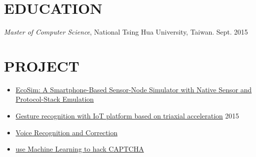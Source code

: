 \documentclass{res}
\begin{document}
\begin{resume}
			\vspace{-0.3in}
			\section{EDUCATION}
			\vspace{0.1in}
				{\sl Master of Computer Science}, National Tsing Hua University, Taiwan. \hfill Sept. 2015\\
				
			\vspace{-0.4in}
			\section{PROJECT}
			\begin{itemize}
					\item \href{https://www.youtube.com/watch?v=1UUcqf0pjM0}{EcoSim: A Smartphone-Based Sensor-Node Simulator with Native Sensor and Protocol-Stack Emulation}
					\vspace{-0.05in}
					\item \href{https://www.youtube.com/watch?v=VInyJABrmPo}{Gesture recognition with IoT platform based on triaxial acceleration}  \hfill2​015
					\vspace{-0.05in}
					\item \href{https://www.youtube.com/watch?v=xZo-bpWrYlk}{Voice Recognition and Correction}
					\vspace{-0.05in}
					\item  \href{https://www.youtube.com/watch?v=9ovWzIu1zy8}{use Machine Learning to hack CAPTCHA}							
			\end{itemize}
				

				          
			 
		\end{resume}
	
\end{document}
